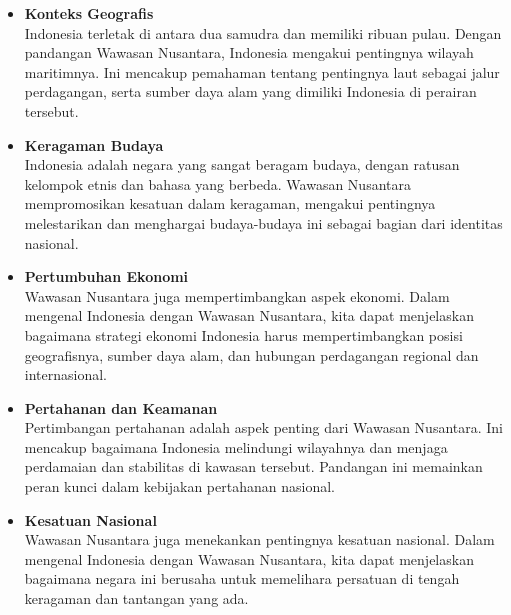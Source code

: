 \begin{itemize}
  \item \textbf{Konteks Geografis} \\ Indonesia terletak di antara dua samudra dan memiliki ribuan pulau. Dengan pandangan Wawasan Nusantara, Indonesia mengakui pentingnya wilayah maritimnya. Ini mencakup pemahaman tentang pentingnya laut sebagai jalur perdagangan, serta sumber daya alam yang dimiliki Indonesia di perairan tersebut.
  
  \item \textbf{Keragaman Budaya} \\ Indonesia adalah negara yang sangat beragam budaya, dengan ratusan kelompok etnis dan bahasa yang berbeda. Wawasan Nusantara mempromosikan kesatuan dalam keragaman, mengakui pentingnya melestarikan dan menghargai budaya-budaya ini sebagai bagian dari identitas nasional.  
  
  \item \textbf{Pertumbuhan Ekonomi} \\ Wawasan Nusantara juga mempertimbangkan aspek ekonomi. Dalam mengenal Indonesia dengan Wawasan Nusantara, kita dapat menjelaskan bagaimana strategi ekonomi Indonesia harus mempertimbangkan posisi geografisnya, sumber daya alam, dan hubungan perdagangan regional dan internasional.  
  
  \item \textbf{Pertahanan dan Keamanan} \\  Pertimbangan pertahanan adalah aspek penting dari Wawasan Nusantara. Ini mencakup bagaimana Indonesia melindungi wilayahnya dan menjaga perdamaian dan stabilitas di kawasan tersebut. Pandangan ini memainkan peran kunci dalam kebijakan pertahanan nasional.
  
  \item \textbf{Kesatuan Nasional} \\ Wawasan Nusantara juga menekankan pentingnya kesatuan nasional. Dalam mengenal Indonesia dengan Wawasan Nusantara, kita dapat menjelaskan bagaimana negara ini berusaha untuk memelihara persatuan di tengah keragaman dan tantangan yang ada.
  
\end{itemize}
